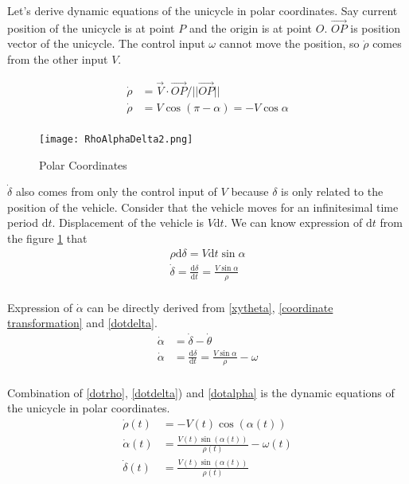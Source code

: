 \documentclass[twoside]{article}
\begin{document}
Let's derive dynamic equations of the unicycle in polar coordinates. Say current position of the unicycle is at point $P$ and the origin is at point $O$. $\overrightarrow{OP}$ is position vector of the unicycle. The control input $\omega$ cannot move the position, so $\dot{\rho}$ comes from the other input $V$.

\begin{equation} \label{dotrho}
\begin{split}
\dot{\rho} &= \vec{V} \cdot \overrightarrow{OP}/||\overrightarrow{OP}|| \\
\dot{\rho} &= V \cos(\pi - \alpha) = -V \cos\alpha \\
\end{split}
\end{equation}

\begin{figure}[h]
\centering
\texttt{[image: RhoAlphaDelta2.png]}
\caption{Polar Coordinates}
\label{RhoAlphaDeltaFigure2}
\end{figure}

$\dot{\delta}$ also comes from only the control input of $V$ because $\delta$ is only related to the position of the vehicle. Consider that the vehicle moves for an infinitesimal time period $\mathrm{d}t$. Displacement of the vehicle is $V\mathrm{d}t$. We can know expression of $\mathrm{d}t$ from the figure \ref{RhoAlphaDeltaFigure2} that
\begin{equation} \label{dotdelta}
\begin{split}
\rho \mathrm{d}\delta = V \mathrm{d}t \sin\alpha \\
\dot{\delta} = \frac{\mathrm{d}\delta}{\mathrm{d}t}=\frac{V \sin\alpha}{\rho}  \\
\end{split}
\end{equation}

Expression of $\dot{\alpha}$ can be directly derived from \eqref{xytheta}, \eqref{coordinate transformation} and \eqref{dotdelta}.
\begin{equation} \label{dotalpha}
\begin{split}
\dot{\alpha} &= \dot{\delta} - \dot{\theta} \\
\dot{\alpha} &=  \frac{\mathrm{d}\delta}{\mathrm{d}t}=\frac{V \sin\alpha}{\rho} - \omega \\
\end{split}
\end{equation}

Combination of \eqref{dotrho}, \eqref{dotdelta}) and \eqref{dotalpha} is the dynamic equations of the unicycle in polar coordinates.
\begin{equation} \label{dotRhoDeltaAlpha}
\begin{split}
\dot{\rho}(t) &= -V(t) \cos(\alpha(t)) \\
\dot{\alpha}(t) &= \frac{V(t) \sin(\alpha(t))}{\rho(t)} - \omega(t) \\
\dot{\delta}(t) &= \frac{V(t) \sin(\alpha(t))}{\rho(t)}  \\
\end{split}
\end{equation}
\end{document}
